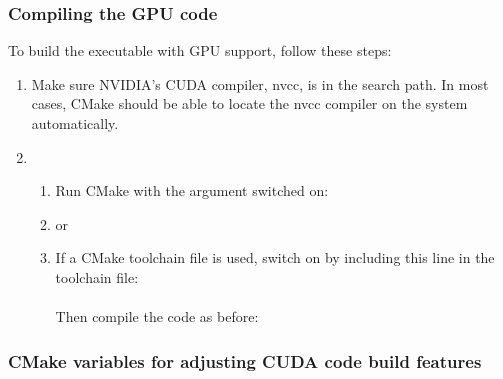 
\subsubsection{Compiling the GPU code}

To build the executable  with GPU support, follow
these steps:

\begin{enumerate}

  \item  Make sure NVIDIA's CUDA compiler, nvcc, is in the search
    path. In most cases, CMake should be able to locate the nvcc
    compiler on the system automatically.
  \item
    \begin{enumerate}
      \item Run CMake with the argument  switched on: \\

       \item[] \hspace{-0.27in} or

       \item If a CMake toolchain file is used, switch on  by
         including this line in the toolchain file: \\
                \\
                Then compile the code as before: \\
    \end{enumerate}

\end{enumerate}


\subsubsection{CMake variables for adjusting CUDA code build features}

